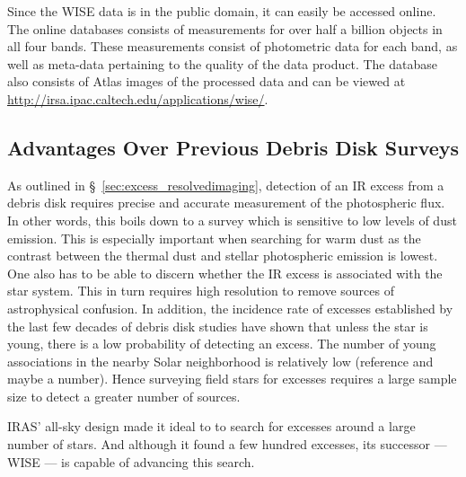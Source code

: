     Since the WISE data is in the public domain, it can easily be accessed online. The online databases consists of measurements for over half a billion objects in all four bands. These measurements consist of photometric data for each band, as well as meta-data pertaining to the quality of the data product. The database also consists of Atlas images of the processed data and can be viewed at \url{http://irsa.ipac.caltech.edu/applications/wise/}. 
    



    \subsection{Advantages Over Previous Debris Disk Surveys}

    As outlined in \S~\ref{sec:excess_resolvedimaging}, detection of an IR excess from a debris disk requires precise and accurate measurement of the photospheric flux. In other words, this boils down to a survey which is sensitive to low levels of dust emission. This is especially important when searching for warm dust as the contrast between the thermal dust and stellar photospheric emission is lowest. One also has to be able to discern whether the IR excess is associated with the star system. This in turn requires high resolution to remove sources of astrophysical confusion. In addition, the incidence rate of excesses established by the last few decades of debris disk studies have shown that unless the star is young, there is a low probability of detecting an excess. The number of young associations in the nearby Solar neighborhood is relatively low (reference and maybe a number). Hence surveying field stars for excesses requires a large sample size to detect a greater number of sources. 
    
    
    IRAS' all-sky design made it ideal to to search for excesses around a large number of stars. And although it found a few hundred excesses, its successor --- WISE --- is capable of advancing this search. 
    
